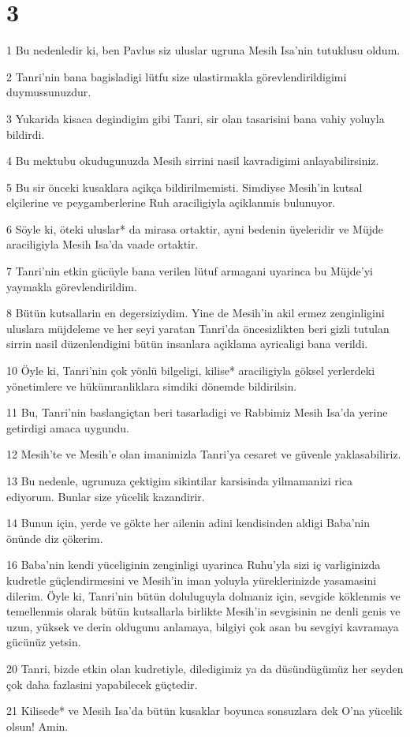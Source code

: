 \chapter{3}

\par 1 Bu nedenledir ki, ben Pavlus siz uluslar ugruna Mesih Isa'nin tutuklusu oldum.
\par 2 Tanri'nin bana bagisladigi lütfu size ulastirmakla görevlendirildigimi duymussunuzdur.
\par 3 Yukarida kisaca degindigim gibi Tanri, sir olan tasarisini bana vahiy yoluyla bildirdi.
\par 4 Bu mektubu okudugunuzda Mesih sirrini nasil kavradigimi anlayabilirsiniz.
\par 5 Bu sir önceki kusaklara açikça bildirilmemisti. Simdiyse Mesih'in kutsal elçilerine ve peygamberlerine Ruh araciligiyla açiklanmis bulunuyor.
\par 6 Söyle ki, öteki uluslar* da mirasa ortaktir, ayni bedenin üyeleridir ve Müjde araciligiyla Mesih Isa'da vaade ortaktir.
\par 7 Tanri'nin etkin gücüyle bana verilen lütuf armagani uyarinca bu Müjde'yi yaymakla görevlendirildim.
\par 8 Bütün kutsallarin en degersiziydim. Yine de Mesih'in akil ermez zenginligini uluslara müjdeleme ve her seyi yaratan Tanri'da öncesizlikten beri gizli tutulan sirrin nasil düzenlendigini bütün insanlara açiklama ayricaligi bana verildi.
\par 10 Öyle ki, Tanri'nin çok yönlü bilgeligi, kilise* araciligiyla göksel yerlerdeki yönetimlere ve hükümranliklara simdiki dönemde bildirilsin.
\par 11 Bu, Tanri'nin baslangiçtan beri tasarladigi ve Rabbimiz Mesih Isa'da yerine getirdigi amaca uygundu.
\par 12 Mesih'te ve Mesih'e olan imanimizla Tanri'ya cesaret ve güvenle yaklasabiliriz.
\par 13 Bu nedenle, ugrunuza çektigim sikintilar karsisinda yilmamanizi rica ediyorum. Bunlar size yücelik kazandirir.
\par 14 Bunun için, yerde ve gökte her ailenin adini kendisinden aldigi Baba'nin önünde diz çökerim.
\par 16 Baba'nin kendi yüceliginin zenginligi uyarinca Ruhu'yla sizi iç varliginizda kudretle güçlendirmesini ve Mesih'in iman yoluyla yüreklerinizde yasamasini dilerim. Öyle ki, Tanri'nin bütün doluluguyla dolmaniz için, sevgide köklenmis ve temellenmis olarak bütün kutsallarla birlikte Mesih'in sevgisinin ne denli genis ve uzun, yüksek ve derin oldugunu anlamaya, bilgiyi çok asan bu sevgiyi kavramaya gücünüz yetsin.
\par 20 Tanri, bizde etkin olan kudretiyle, diledigimiz ya da düsündügümüz her seyden çok daha fazlasini yapabilecek güçtedir.
\par 21 Kilisede* ve Mesih Isa'da bütün kusaklar boyunca sonsuzlara dek O'na yücelik olsun! Amin.

